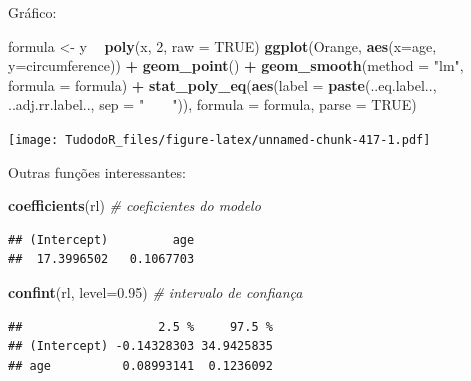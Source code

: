 \documentclass[
]{book}
\newenvironment{Shaded}{\begin{snugshade}}{\end{snugshade}}
\newcommand{\CommentTok}[1]{\textcolor[rgb]{0.56,0.35,0.01}{\textit{#1}}}
\newcommand{\DataTypeTok}[1]{\textcolor[rgb]{0.13,0.29,0.53}{#1}}
\newcommand{\DecValTok}[1]{\textcolor[rgb]{0.00,0.00,0.81}{#1}}
\newcommand{\FloatTok}[1]{\textcolor[rgb]{0.00,0.00,0.81}{#1}}
\newcommand{\KeywordTok}[1]{\textcolor[rgb]{0.13,0.29,0.53}{\textbf{#1}}}
\newcommand{\NormalTok}[1]{#1}
\newcommand{\OperatorTok}[1]{\textcolor[rgb]{0.81,0.36,0.00}{\textbf{#1}}}
\newcommand{\OtherTok}[1]{\textcolor[rgb]{0.56,0.35,0.01}{#1}}
\newcommand{\StringTok}[1]{\textcolor[rgb]{0.31,0.60,0.02}{#1}}
\begin{document}
Gráfico:

\begin{Shaded}
\begin{Highlighting}[]
\NormalTok{formula <-}\StringTok{ }\NormalTok{y }\OperatorTok{~}\StringTok{ }\KeywordTok{poly}\NormalTok{(x, }\DecValTok{2}\NormalTok{, }\DataTypeTok{raw =} \OtherTok{TRUE}\NormalTok{)}
\KeywordTok{ggplot}\NormalTok{(Orange, }\KeywordTok{aes}\NormalTok{(}\DataTypeTok{x=}\NormalTok{age, }\DataTypeTok{y=}\NormalTok{circumference)) }\OperatorTok{+}
\StringTok{  }\KeywordTok{geom_point}\NormalTok{() }\OperatorTok{+}
\StringTok{  }\KeywordTok{geom_smooth}\NormalTok{(}\DataTypeTok{method =} \StringTok{"lm"}\NormalTok{, }\DataTypeTok{formula =}\NormalTok{ formula) }\OperatorTok{+}
\StringTok{  }\KeywordTok{stat_poly_eq}\NormalTok{(}\KeywordTok{aes}\NormalTok{(}\DataTypeTok{label =}  \KeywordTok{paste}\NormalTok{(..eq.label.., ..adj.rr.label.., }\DataTypeTok{sep =} \StringTok{"~~~~"}\NormalTok{)),}
    \DataTypeTok{formula =}\NormalTok{ formula, }\DataTypeTok{parse =} \OtherTok{TRUE}\NormalTok{)}
\end{Highlighting}
\end{Shaded}

\texttt{[image: TudodoR\_files/figure-latex/unnamed-chunk-417-1.pdf]}

Outras funções interessantes:

\begin{Shaded}
\begin{Highlighting}[]
\KeywordTok{coefficients}\NormalTok{(rl) }\CommentTok{# coeficientes do modelo}
\end{Highlighting}
\end{Shaded}

\begin{verbatim}
## (Intercept)         age 
##  17.3996502   0.1067703
\end{verbatim}

\begin{Shaded}
\begin{Highlighting}[]
\KeywordTok{confint}\NormalTok{(rl, }\DataTypeTok{level=}\FloatTok{0.95}\NormalTok{) }\CommentTok{# intervalo de confiança}
\end{Highlighting}
\end{Shaded}

\begin{verbatim}
##                   2.5 %     97.5 %
## (Intercept) -0.14328303 34.9425835
## age          0.08993141  0.1236092
\end{verbatim}
\end{document}
